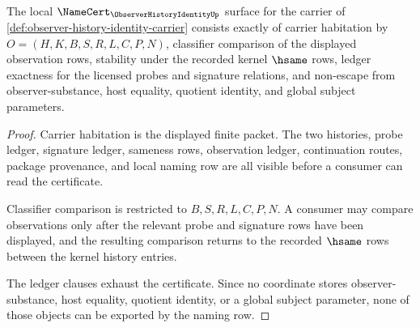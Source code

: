 \begin{theorem}
\label{thm:observer-history-identity-namecert-obligations}
The local $\NameCert_{\ObserverHistoryIdentityUp}$ surface for the carrier of \autoref{def:observer-history-identity-carrier} consists exactly of carrier habitation by $O=(H,K,B,S,R,L,C,P,N)$, classifier comparison of the displayed observation rows, stability under the recorded kernel $\hsame$ rows, ledger exactness for the licensed probes and signature relations, and non-escape from observer-substance, host equality, quotient identity, and global subject parameters.
\end{theorem}
\begin{proof}
Carrier habitation is the displayed finite packet. The two histories, probe ledger, signature ledger, sameness rows, observation ledger, continuation routes, package provenance, and local naming row are all visible before a consumer can read the certificate.

Classifier comparison is restricted to $B,S,R,L,C,P,N$. A consumer may compare observations only after the relevant probe and signature rows have been displayed, and the resulting comparison returns to the recorded $\hsame$ rows between the kernel history entries.

The ledger clauses exhaust the certificate. Since no coordinate stores observer-substance, host equality, quotient identity, or a global subject parameter, none of those objects can be exported by the naming row.
\end{proof}

